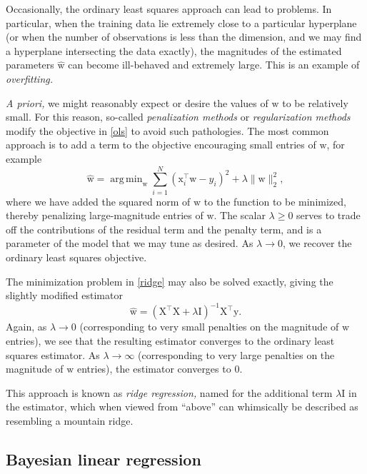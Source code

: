 \documentclass{article}
\newcommand{\inv}{^{-1}}
\newcommand{\trans}{^\top}
\newcommand{\mat}[1]{\bm{\mathrm{#1}}}
\renewcommand{\vec}[1]{\bm{\mathrm{#1}}}
\DeclareMathOperator*{\argmin}{arg\,min}
\begin{document}
Occasionally, the ordinary least squares approach can lead to
problems.  In particular, when the training data lie extremely close
to a particular hyperplane (or when the number of observations is less
than the dimension, and we may find a hyperplane intersecting the data
exactly), the magnitudes of the estimated parameters $\hat{\vec{w}}$
can become ill-behaved and extremely large.  This is an example of
\emph{overfitting.}

\emph{A priori,} we might reasonably expect or desire the values of
$\vec{w}$ to be relatively small.  For this reason, so-called
\emph{penalization methods} or \emph{regularization methods} modify
the objective in \eqref{ols} to avoid such pathologies.  The most
common approach is to add a term to the objective encouraging small
entries of $\vec{w}$, for example
\begin{equation}
  \label{ridge}
  \hat{\vec{w}}
  =
  \argmin_{\vec{w}}
  \sum_{i = 1}^N
  (\vec{x}_i\trans \vec{w} - y_i)^2
  +
  \lambda
  \lVert \vec{w} \rVert_{2}^2,
\end{equation}
where we have added the squared norm of $\vec{w}$ to the function to
be minimized, thereby penalizing large-magnitude entries of $\vec{w}$.
The scalar $\lambda \geq 0$ serves to trade off the contributions of
the residual term and the penalty term, and is a parameter of the
model that we may tune as desired.  As $\lambda \to 0$, we recover the
ordinary least squares objective.

The minimization problem in \eqref{ridge} may also be solved exactly,
giving the slightly modified estimator
\begin{equation*}
  \hat{\vec{w}} = (\mat{X}\trans\mat{X} + \lambda \mat{I})\inv \mat{X}\trans \vec{y}.
\end{equation*}
Again, as $\lambda \to 0$ (corresponding to very small penalties on
the magnitude of $\vec{w}$ entries), we see that the resulting
estimator converges to the ordinary least squares estimator.  As
$\lambda \to \infty$ (corresponding to very large penalties on the
magnitude of $\vec{w}$ entries), the estimator converges to $\vec{0}$.

This approach is known as \emph{ridge regression,} named for the
additional term $\lambda \mat{I}$ in the estimator, which when viewed
from ``above'' can whimsically be described as resembling a mountain
ridge.

\subsection*{Bayesian linear regression}
\end{document}

